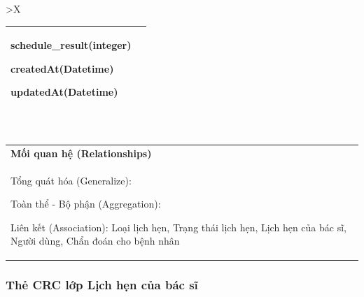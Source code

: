 \begin{xltabular}{\textwidth}{
		>{\centering\arraybackslash}X
	}
\begin{tabularx}{0.9\textwidth}{|X|X|}
		schedule\_result(integer)

		createdAt(Datetime)

		updatedAt(Datetime)
		\\ \hline
	\end{tabularx}
	\\
	\begin{tabularx}{0.9\textwidth}{|X|}
		\hline
		\textbf{Mối quan hệ (Relationships)} \\
		Tổng quát hóa (Generalize):

		Toàn thể - Bộ phận (Aggregation):

		Liên kết (Association): Loại lịch hẹn, Trạng thái lịch hẹn, Lịch hẹn của bác sĩ,
		Người dùng, Chẩn đoán cho bệnh nhân
		\\
		\hline
	\end{tabularx}
\end{xltabular}

\subsubsection{Thẻ CRC lớp Lịch hẹn của bác sĩ}

